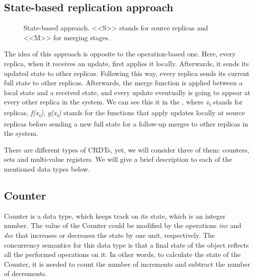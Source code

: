 
\subsection*{State-based replication approach}
\begin{figure}[!htb]
    \begin{center}
    \def\svgwidth{\linewidth}
    
    \caption {State-based approach\cite{2}. <<S>> stands for source replicas and <<M>> for merging stages.}
    \label{fig:theory2}
\end{center}
\end{figure}

The idea of this approach is opposite to the operation-based one. Here, every replica, when it receives an update, first applies it locally. Afterwards, it sends its updated state to other replicas. Following this way, every replica sends its current full state to other replicas. Afterwards, the merge function is applied between a local state and a received state, and every update eventually is going to appear at every other replica in the system. We can see this it in the , where \textit{x\textsubscript{i}} stands for replicas, \textit{f(x\textsubscript{i})}, \textit{g(x\textsubscript{i})} stands for the functions that apply updates locally at source replicas before sending a new full state for a follow-up merges to other replicas in the system.


There are different types of CRDTs, yet, we will consider three of them: counters, sets and multi-value registers. We will give a brief description to each of the mentioned data types below.

\subsection*{Counter}

Counter is a data type, which keeps track on its state, which is an integer number. The value of the Counter could be modified by the operations \textit{inc} and \textit{dec} that increases or decreases the state by one unit, respectively\cite{3}. The concurrency semantics for this data type is that a final state of the object reflects all the performed operations on it. In other words, to calculate the state of the Counter, it is needed to count the number of increments and subtract the number of decrements. 

